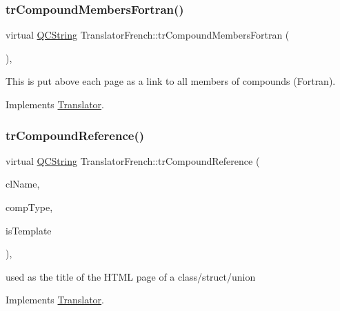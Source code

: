 \subsubsection{\texorpdfstring{trCompoundMembersFortran()}{trCompoundMembersFortran()}}
{\footnotesize\ttfamily virtual \mbox{\hyperlink{class_q_c_string}{Q\+C\+String}} Translator\+French\+::tr\+Compound\+Members\+Fortran (\begin{DoxyParamCaption}{ }\end{DoxyParamCaption})\hspace{0.3cm}{\ttfamily [inline]}, {\ttfamily [virtual]}}

This is put above each page as a link to all members of compounds (Fortran). 

Implements \mbox{\hyperlink{class_translator}{Translator}}.

\mbox{\label{class_translator_french_a716b1c32b1deb4e61de1bc45734af2eb}} 
\subsubsection{\texorpdfstring{trCompoundReference()}{trCompoundReference()}}
{\footnotesize\ttfamily virtual \mbox{\hyperlink{class_q_c_string}{Q\+C\+String}} Translator\+French\+::tr\+Compound\+Reference (\begin{DoxyParamCaption}\item[{const char $\ast$}]{cl\+Name,  }\item[{\mbox{\hyperlink{class_class_def_ae70cf86d35fe954a94c566fbcfc87939}{Class\+Def\+::\+Compound\+Type}}}]{comp\+Type,  }\item[{bool}]{is\+Template }\end{DoxyParamCaption})\hspace{0.3cm}{\ttfamily [inline]}, {\ttfamily [virtual]}}

used as the title of the H\+T\+ML page of a class/struct/union 

Implements \mbox{\hyperlink{class_translator}{Translator}}.

\mbox{\label{class_translator_french_a7d29c3ea2b973df5a72264a9e920013e}} 
